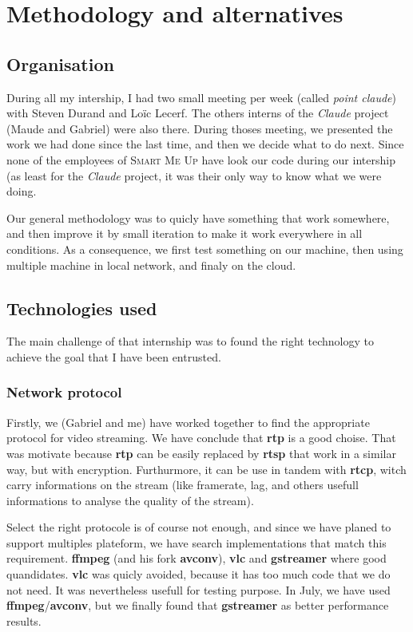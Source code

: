 \documentclass[a4paper,11pt]{custom}
\newcommand{\smu}{\textsc{Smart Me Up}}
\newcommand{\rtp}{\textbf{rtp}\xspace}
\newcommand{\rtcp}{\textbf{rtcp}\xspace}
\newcommand{\rtsp}{\textbf{rtsp}\xspace}
\newcommand{\vlc}{\textbf{vlc}\xspace}
\newcommand{\avconv}{\textbf{avconv}\xspace}
\newcommand{\ffmpeg}{\textbf{ffmpeg}\xspace}
\newcommand{\gstreamer}{\textbf{gstreamer}\xspace}
\newcommand{\claude}{\textit{Claude}\xspace}
\begin{document}
\chapter{Methodology and alternatives}
\label{sec:methodology}

\section{Organisation}

During all my intership, I had two small meeting per week (called \textit{point
claude}) with Steven Durand and Loïc Lecerf. The others interns of the \claude{}
project (Maude and Gabriel) were also there. During thoses meeting, we presented
the work we had done since the last time, and then we decide what to do next.
Since none of the employees of \smu{} have look our code during our intership (as
least for the \claude{} project, it was their only way to know what we were
doing.

Our general methodology was to quicly have something that work somewhere, and
then improve it by small iteration to make it work everywhere in all conditions.
As a consequence, we first test something on our machine, then using multiple
machine in local network, and finaly on the cloud.


\section{Technologies used}
\label{sec:technologies}

The main challenge of that internship was to found the right technology to
achieve the goal that I have been entrusted.

\subsection{Network protocol}

Firstly, we (Gabriel and me) have worked together to find the appropriate
protocol for video streaming. We have conclude that \rtp{} is a good choise.
That was motivate because \rtp{} can be easily replaced by \rtsp{} that work in
a similar way, but with encryption. Furthurmore, it can be use in tandem with
\rtcp, witch carry informations on the stream (like framerate, lag, and others
usefull informations to analyse the quality of the stream).

Select the right protocole is of course not enough, and since we have planed to
support multiples plateform, we have search implementations that match this
requirement. \ffmpeg{} (and his fork \avconv), \vlc{} and \gstreamer{} where good
quandidates. \vlc{} was quicly avoided, because it has too much code that we do
not need. It was nevertheless usefull for testing purpose. In July, we have used
\ffmpeg/\avconv, but we finally found that \gstreamer{} as better performance
results.
\end{document}

